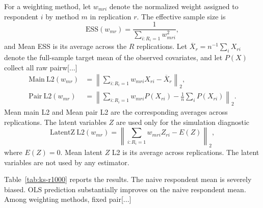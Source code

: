 \documentclass[11pt]{article}
\begin{document}
{For a weighting method, let $w_{mri}$ denote the normalized weight assigned to respondent $i$ by method $m$ in replication $r$. The effective sample size is
\begin{equation*}
\mathrm{ESS}(w_{mr})
=
\frac{1}{\sum_{i:R_i=1}w_{mri}^2},
\end{equation*}
and Mean ESS is its average across the $R$ replications. Let $\overline X_r=n^{-1}\sum_iX_{ri}$ denote the full-sample target mean of the observed covariates, and let $P(X)$ collect all raw pairw[...]
\begin{align*}
\mathrm{Main~L2}(w_{mr})
&=
\left\|
\sum_{i:R_i=1}w_{mri}X_{ri}-\overline X_r
\right\|_2,\\
\mathrm{Pair~L2}(w_{mr})
&=
\left\|
\sum_{i:R_i=1}w_{mri}P(X_{ri})
-\frac{1}{n}\sum_iP(X_{ri})
\right\|_2.
\end{align*}
Mean main L2 and Mean pair L2 are the corresponding averages across replications. The latent variables $Z$ are used only for the simulation diagnostic
\begin{equation*}
\mathrm{LatentZ~L2}(w_{mr})
=
\left\|
\sum_{i:R_i=1}w_{mri}Z_{ri}-E(Z)
\right\|_2,
\end{equation*}
where $E(Z)=0$. Mean latent $Z$ L2 is its average across replications. The latent variables are not used by any estimator.

Table~\ref{tab:ks-r1000} reports the results. The naive respondent mean is severely biased. OLS prediction substantially improves on the naive respondent mean. Among weighting methods, fixed pair[...]

\begin{table}[H]
\centering
\caption{Kang--Schafer-style missing-data simulation, $n=1000$, $R=1000$ independently generated random samples.}
\label{tab:ks-r1000}
\small
{}
\end{table}

}
\end{document}
